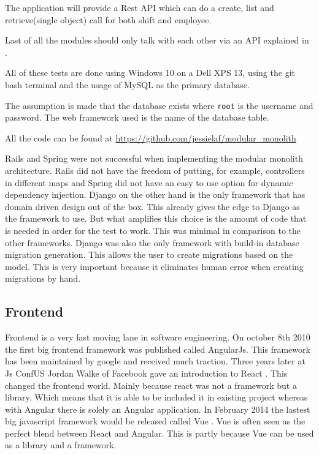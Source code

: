 The application will provide a Rest API which can do a create, list and retrieve(single object) call for both shift and employee.

Last of all the modules should only talk with each other via an API explained in .

All of these tests are done using Windows 10 on a Dell XPS 13, using the git bash terminal and the usage of MySQL as the primary database.

The assumption is made that the database exists where \texttt{root} is the username and password. The web framework used is the name of the database table.

All the code can be found at \url{https://github.com/jessielaf/modular_monolith}

Rails and Spring were not successful when implementing the modular monolith architecture. Rails did not have the freedom of putting, for example, controllers in different maps and Spring did not have an easy to use option for dynamic dependency injection. Django on the other hand is the only framework that has domain driven design out of the box. This already gives the edge to Django as the framework to use. But what amplifies this choice is the amount of code that is needed in order for the test to work. This was minimal in comparison to the other frameworks. Django was also the only framework with build-in database migration generation. This allows the user to create migrations based on the model. This is very important because it eliminates human error when creating migrations by hand.

\subsection{Frontend}
\label{sec:Frontend}

Frontend is a very fast moving lane in software engineering. On october 8th 2010 \cite{angularJs} the first big frontend framework was published called AngularJs. This framework has been maintained by google and received much traction. Three years later at Js ConfUS Jordan Walke of Facebook gave an introduction to React \cite{reactJs}. This changed the frontend world. Mainly because react was not a framework but a library. Which means that it is able to be included it in existing project whereas with Angular there is solely an Angular application. In February 2014 the lastest big javascript framework would be released called Vue \cite{vueJs}. Vue is often seen as the perfect blend between React and Angular. This is partly because Vue can be used as a library and a framework.

